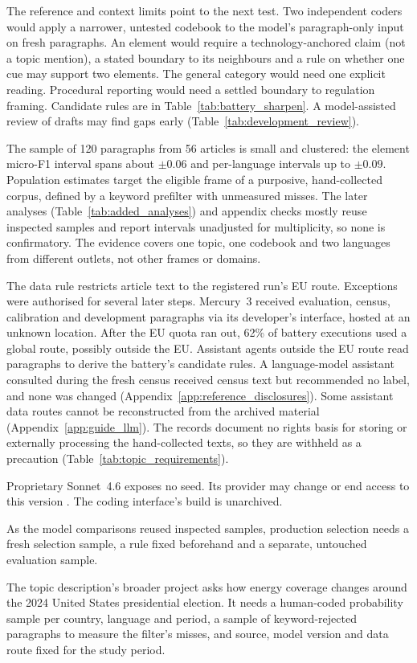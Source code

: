 The reference and context limits point to the next test. Two independent coders would apply a narrower, untested codebook to the model's paragraph-only input on fresh paragraphs. An element would require a technology-anchored claim (not a topic mention), a stated boundary to its neighbours and a rule on whether one cue may support two elements. The general category would need one explicit reading. Procedural reporting would need a settled boundary to regulation framing. Candidate rules are in Table~\ref{tab:battery_sharpen}. A model-assisted review of drafts may find gaps early (Table~\ref{tab:development_review}).

The sample of 120 paragraphs from 56 articles is small and clustered: the element micro-F1 interval spans about $\pm 0.06$ and per-language intervals up to $\pm 0.09$. Population estimates target the eligible frame of a purposive, hand-collected corpus, defined by a keyword prefilter with unmeasured misses. The later analyses (Table~\ref{tab:added_analyses}) and appendix checks mostly reuse inspected samples and report intervals unadjusted for multiplicity, so none is confirmatory. The evidence covers one topic, one codebook and two languages from different outlets, not other frames or domains.

The data rule restricts article text to the registered run's EU route. Exceptions were authorised for several later steps. Mercury~3 received evaluation, census, calibration and development paragraphs via its developer's interface, hosted at an unknown location. After the EU quota ran out, 62\% of battery executions used a global route, possibly outside the EU. Assistant agents outside the EU route read paragraphs to derive the battery's candidate rules. A language-model assistant consulted during the fresh census received census text but recommended no label, and none was changed (Appendix~\ref{app:reference_disclosures}). Some assistant data routes cannot be reconstructed from the archived material (Appendix~\ref{app:guide_llm}). The records document no rights basis for storing or externally processing the hand-collected texts, so they are withheld as a precaution (Table~\ref{tab:topic_requirements}).

Proprietary Sonnet~4.6 exposes no seed. Its provider may change or end access to this version \parencite{feuerriegel2026guidellm}. The coding interface's build is unarchived.

As the model comparisons reused inspected samples, production selection needs a fresh selection sample, a rule fixed beforehand and a separate, untouched evaluation sample.

The topic description's broader project asks how energy coverage changes around the 2024 United States presidential election. It needs a human-coded probability sample per country, language and period, a sample of keyword-rejected paragraphs to measure the filter's misses, and source, model version and data route fixed for the study period.
